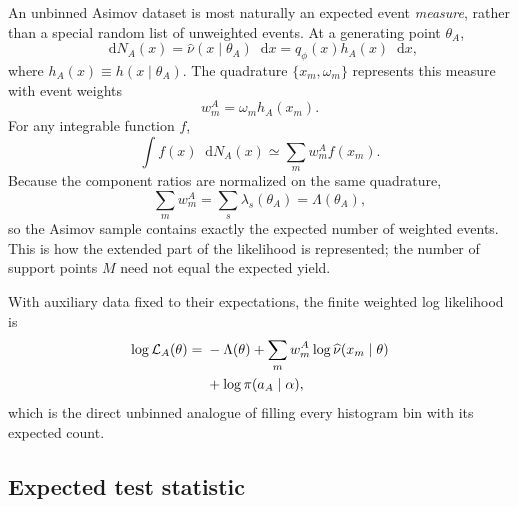 \documentclass[
  aps,
  prd,
  superscriptaddress,
  nofootinbib,
  longbibliography,
  12pt
]{revtex4-2}
\newcommand{\dd}{\mathop{}\!\mathrm{d}}
\newcommand{\Lcal}{\mathcal{L}}
\newcommand{\qRef}{q_{\phi}}
\begin{document}
An unbinned Asimov dataset is most naturally an expected event \emph{measure}, rather than a special random list of unweighted events.  At a generating point $\theta_A$,
\begin{equation}
  \dd N_A(x)
  =\widehat\nu(x\mid\theta_A)\dd x
  =\qRef(x)h_A(x)\dd x,
  \label{eq:asimov-measure}
\end{equation}
where $h_A(x)\equiv h(x\mid\theta_A)$.  The quadrature $\{x_m,\omega_m\}$ represents this measure with event weights
\begin{equation}
  w_m^A=\omega_m h_A(x_m).
  \label{eq:asimov-weights}
\end{equation}
For any integrable function $f$,
\begin{equation}
  \int f(x)\dd N_A(x)
  \simeq\sum_mw_m^A f(x_m).
  \label{eq:asimov-quadrature}
\end{equation}
Because the component ratios are normalized on the same quadrature,
\begin{equation}
  \sum_mw_m^A
  =\sum_s\lambda_s(\theta_A)=\Lambda(\theta_A),
  \label{eq:asimov-total-yield}
\end{equation}
so the Asimov sample contains exactly the expected number of weighted events.  This is how the extended part of the likelihood is represented; the number of support points $M$ need not equal the expected yield.

With auxiliary data fixed to their expectations, the finite weighted log likelihood is
\begin{align}
  \log\Lcal_A(\theta)
  ={}&-\Lambda(\theta)
   +\sum_mw_m^A\log\widehat\nu(x_m\mid\theta)\notag\\
  &+\log\pi(a_A\mid\alpha),
  \label{eq:asimov-loglikelihood}
\end{align}
which is the direct unbinned analogue of filling every histogram bin with its expected count.

\subsection{Expected test statistic}
\end{document}
